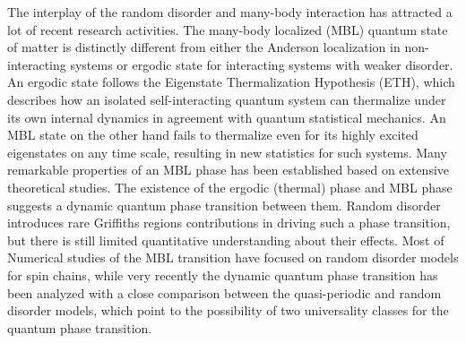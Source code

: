 \documentclass[prl,aps,epsf,showpacs,twocolumn,letterpaper]{revtex4}
\begin{document}
The interplay of the random disorder and many-body interaction has attracted a
lot of recent research activities\cite{basko2006, oganesyan2007, pal2010,
znidaric2008, huse2013, nandkishore2015, altman2015, huse2014, nandkishore2014,
pekker_hilbert2014}.
The many-body localized (MBL) quantum state\cite{nandkishore2015, altman2015,
huse2014, nandkishore2014, pekker_hilbert2014} of matter is distinctly different
from either the Anderson localization in non-interacting systems or ergodic
state for interacting systems with weaker disorder.
An ergodic state follows the Eigenstate Thermalization Hypothesis (ETH), which
describes how an isolated self-interacting quantum system can thermalize under
its own internal dynamics in agreement with quantum statistical
mechanics\cite{deutsch1991, srednicki1994, rigol2008}.
An MBL state on the other hand fails to thermalize even for its highly excited
eigenstates on any time scale, resulting in new statistics for such
systems\cite{basko2006, oganesyan2007, pal2010, znidaric2008, huse2013,
  nandkishore2015, altman2015, huse2014, nandkishore2014, pekker_hilbert2014}.
Many remarkable properties of an MBL phase has been
established\cite{nandkishore2015, altman2015, huse2013, nandkishore2014,
  oganesyan2007, pal2010, znidaric2008, rigol2008, serbyn2014, kwasigroch2014,
  yao2014, vasseur2015, huse2014, serbyn2013, ros2015, chandran2014, grover2014,
  agarwal2015, knap2015, luitz2015, devakul2015, torres2015, canovi2011,
  cuevas2012, bauer2013, kjall2014, luca2013, iyer2013, pekker_hilbert2014,
  johri2014, bardarson2012, andraschko2014, laumann2014, hickey2014,
nanduri2014, barlev2014, imbrie2014, groverf2014, ponte2015, huang2015, you2015,
serbyn2015, singh2015, barlev2015, deng2015, chen2015} based on extensive
theoretical studies.
The existence of the ergodic (thermal) phase and MBL phase suggests a dynamic
quantum phase transition between them\cite{basko2006, pal2010, oganesyan2007,
kjall2014, vosk_theory2014, potter2015trans, serbyn2015, agarwal2015, knap2015,
lim2016, zhang2016, zhang2016a, yu2016, vedika2016, dumitrescu2017}.
Random disorder introduces rare Griffiths regions
contributions in driving such a phase transition, but there is still limited
quantitative understanding about their effects. %
Most of Numerical studies of the MBL transition have focused on random disorder
models for spin chains\cite{pal2010, kjall2014, luitz2015, yu2016, vedika2016},
while very recently the dynamic quantum phase transition has been analyzed with
a close comparison between the quasi-periodic and random disorder models, which
point to the possibility of two universality classes for the quantum phase
transition\cite{vedika2017, vedika2016}.
\end{document}
